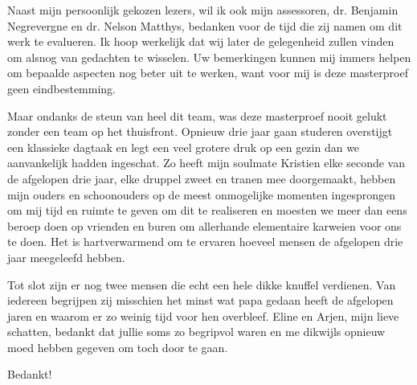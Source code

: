 \begin{preface}
Naast mijn persoonlijk gekozen lezers, wil ik ook mijn assessoren, dr. Benjamin
Negrevergne en dr. Nelson Matthys, bedanken voor de tijd die zij namen om dit
werk te evalueren. Ik hoop werkelijk dat wij later de gelegenheid zullen vinden
om alsnog van gedachten te wisselen. Uw bemerkingen kunnen mij immers helpen om
bepaalde aspecten nog beter uit te werken, want voor mij is deze masterproef
geen eindbestemming.

Maar ondanks de steun van heel dit team, was deze masterproef nooit gelukt
zonder een team op het thuisfront. Opnieuw drie jaar gaan studeren overstijgt
een klassieke dagtaak en legt een veel grotere druk op een gezin dan we
aanvankelijk hadden ingeschat. Zo heeft mijn soulmate Kristien elke seconde van
de afgelopen drie jaar, elke druppel zweet en tranen mee doorgemaakt, hebben
mijn ouders en schoonouders op de meest onmogelijke momenten ingesprongen om
mij tijd en ruimte te geven om dit te realiseren en moesten we meer dan eens
beroep doen op vrienden en buren om allerhande elementaire karweien voor ons te
doen. Het is hartverwarmend om te ervaren hoeveel mensen de afgelopen drie jaar
meegeleefd hebben.

Tot slot zijn er nog twee mensen die echt een hele dikke knuffel verdienen. Van
iedereen begrijpen zij misschien het minst wat papa gedaan heeft de afgelopen
jaren en waarom er zo weinig tijd voor hen overbleef. Eline en Arjen, mijn
lieve schatten, bedankt dat jullie soms zo begripvol waren en me dikwijls
opnieuw moed hebben gegeven om toch door te gaan.

\bigskip

Bedankt!

\end{preface}
